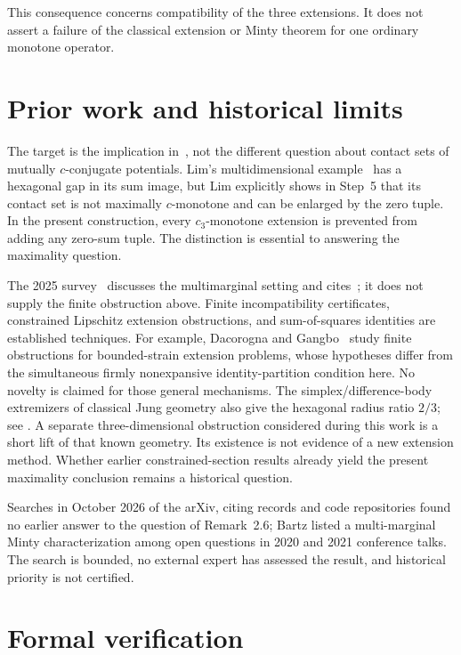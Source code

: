 \documentclass[11pt]{article}
\begin{document}
This consequence concerns compatibility of the three extensions. It does
not assert a failure of the classical extension or Minty theorem for one
ordinary monotone operator.

\section{Prior work and historical limits}

The target is the implication in~\cite[Remark~2.6]{BBPW}, not the
different question about contact sets of mutually $c$-conjugate
potentials. Lim's multidimensional example~\cite[Proposition~1.10 and
Example~4.1]{Lim} has a hexagonal gap in its sum image, but Lim explicitly
shows in Step~5 that its contact set is not maximally $c$-monotone and can
be enlarged by the zero tuple. In the present construction, every
$c_3$-monotone extension is prevented from adding any zero-sum tuple.
The distinction is essential to answering the maximality question.

The 2025 survey~\cite{Survey} discusses the multimarginal setting and
cites~\cite{BBPW}; it does not supply the finite obstruction above.
Finite incompatibility certificates, constrained Lipschitz extension
obstructions, and sum-of-squares identities are established techniques.
For example, Dacorogna and Gangbo~\cite{DG} study finite obstructions for
bounded-strain extension problems, whose hypotheses differ from the
simultaneous firmly nonexpansive identity-partition condition here.
No novelty is claimed for those general mechanisms.
The simplex/difference-body extremizers of classical Jung geometry also
give the hexagonal radius ratio $2/3$; see
\cite[Lemma~2.9 and Corollary~2.10]{JungGeometry}. A separate
three-dimensional obstruction considered during this work is a short
lift of that known geometry. Its existence is not evidence of a new
extension method. Whether earlier constrained-section results already
yield the present maximality conclusion remains a historical question.

Searches in October 2026 of the arXiv, citing records and code
repositories found no earlier answer to the question of Remark~2.6;
Bartz listed a multi-marginal Minty characterization among open questions
in 2020 and 2021 conference talks. The search is bounded, no external
expert has assessed the result, and historical priority is not certified.

\section{Formal verification}\label{sec:lean}
\end{document}
